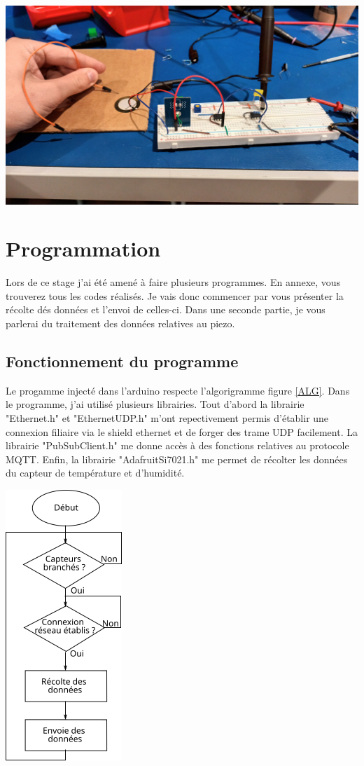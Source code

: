 \documentclass[12pt,french,a4paper]{article}
\begin{document}
\begin{center}	
\includegraphics[scale=0.1]{../img/froty.jpg}
\label{M}
\end{center}

\newpage
\section{Programmation}
Lors de ce stage j'ai été amené à faire plusieurs programmes. En annexe, vous trouverez tous les codes réalisés. Je vais donc commencer par vous présenter la récolte dés données et l'envoi de celles-ci. Dans une seconde partie, je vous parlerai du traitement des données relatives au piezo. 

\subsection{Fonctionnement du programme}
Le progamme injecté dans l'arduino respecte l'algorigramme figure \ref{ALG}. Dans le programme, j'ai utilisé plusieurs librairies. Tout d'abord la librairie "Ethernet.h" et "EthernetUDP.h"  m'ont repectivement permis d'établir une connexion filiaire via le shield ethernet et de forger des trame UDP facilement. La librairie "PubSubClient.h" me donne accès à des fonctions relatives au protocole MQTT. Enfin, la librairie "AdafruitSi7021.h" me permet de récolter les données du capteur de température et d'humidité.  
\begin{center}	
\includegraphics[scale=1]{../img/algorigrame.png}
\label{ALG}
\end{center}
\end{document}

